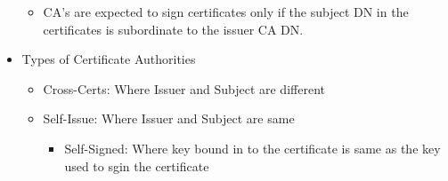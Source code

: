 \documentclass[a4paper]{article}
\begin{document}
\begin{itemize}
\begin{itemize}
                    \item CA's are expected to sign certificates only if the subject DN in the
                        certificates is subordinate to the issuer CA DN.
                \end{itemize}
            \item Types of Certificate Authorities
                \begin{itemize}
                    \item Cross-Certs: Where Issuer and Subject are different
                    \item Self-Issue: Where Issuer and Subject are same
                        \begin{itemize}
                            \item Self-Signed: Where key bound in to the certificate is same as the key used to sgin the certificate
                        \end{itemize}
                \end{itemize}
        \end{itemize}
\end{document}
